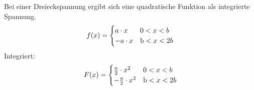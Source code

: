 Bei einer Dreieckspannung ergibt sich eine quadratische Funktion als integrierte Spannung.
\begin{equation*}
  f(x) =
  \begin{cases}
    a \cdot x & \text 0 < x < b \\
    -a \cdot x & \text b < x < 2b \\
  \end{cases}
\end{equation*}
Integriert:
\begin{equation*}
  F(x) =
  \begin{cases}
    \frac{a}{2} \cdot x^2 & \text 0 < x < b \\
    -\frac{a}{2} \cdot x^2 & \text b < x < 2b \\
  \end{cases}
\end{equation*}
